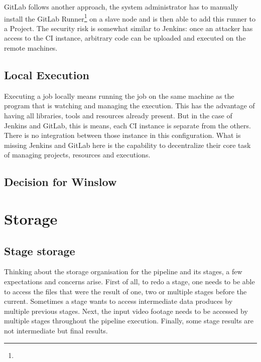 
GitLab follows another approach, the system administrator has to manually install the GitLab Runner\footnote{} on a slave node and is then able to add this runner to a Project.
The security risk is somewhat similar to Jenkins: once an attacker has access to the CI instance, arbitrary code can be uploaded and executed on the remote machines. 


\subsection{Local Execution}

Executing a job locally means running the job on the same machine as the program that is watching and managing the execution.
This has the advantage of having all libraries, tools and resources already present.
But in the case of Jenkins and GitLab, this is means, each CI instance is separate from the others.
There is no integration between those instance in this configuration.
What is missing Jenkins and GitLab here is the capability to decentralize their core task of managing projects, resources and executions.


\subsection{Decision for Winslow}


\section{Storage}

\subsection{Stage storage}


Thinking about the storage organisation for the pipeline and its stages, a few expectations and concerns arise.
First of all, to redo a stage, one needs to be able to access the files that were the result of one, two or multiple stages before the current.
Sometimes a stage wants to access intermediate data produces by multiple previous stages.
Next, the input video footage needs to be accessed by multiple stages throughout the pipeline execution.
Finally, some stage results are not intermediate but final results.

